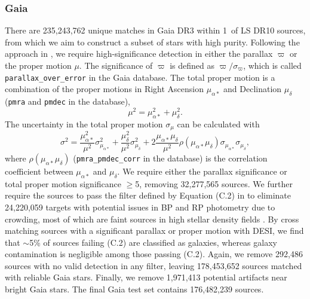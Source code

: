\documentclass[twocolumn,tighten]{aastex631}
\newcommand{\dr}[1]{DR{#1}}
\begin{document}
\begin{CJK*}{UTF8}{gbsn}
\subsubsection{Gaia}\label{sec:Gaia}
There are 235,243,762 unique matches in Gaia \dr{3} within 1\arcsec\ of LS \dr{10} sources, from which we aim to construct a subset of stars with high purity. Following the approach in , we require high-significance detection in either the parallax $\varpi$ or the proper motion $\mu$. The significance of $\varpi$ is defined as $\varpi/\sigma_\varpi$, which is called {\tt parallax\_over\_error} in the Gaia database. The total proper motion is a combination of the proper motions in Right Ascension $\mu_{\alpha*}$ and Declination $\mu_\delta$ ({\tt pmra} and {\tt pmdec} in the database),
\begin{equation*}
    \mu^2 = \mu_{\alpha*}^2 + \mu_\delta^2.
\end{equation*}
The uncertainty in the total proper motion $\sigma_\mu$ can be calculated with
\begin{equation*}
    \sigma^2 = \frac{\mu_{\alpha*}^2}{\mu^2}\sigma_{\mu_{\alpha*}}^2 + \frac{\mu_{\delta}^2}{\mu^2}\sigma_{\mu_{\delta}}^2 + 2\frac{\mu_{\alpha*}\mu_\delta}{\mu^2}\rho(\mu_{\alpha*}\mu_\delta)\sigma_{\mu_{\alpha*}}\sigma_{\mu_{\delta}},
\end{equation*}
where $\rho(\mu_{\alpha*}\mu_\delta)$ ({\tt pmra\_pmdec\_corr} in the database) is the correlation coefficient between $\mu_{\alpha*}$ and $\mu_\delta$. We require either the parallax significance or total proper motion significance $\ge$5, removing 32,277,565 sources. 
We further require the sources to pass the filter defined by Equation (C.2) in \cite{Lindegren_2018} to eliminate 24,220,059 targets with potential issues in BP and RP photometry {due to crowding, most of which are faint sources in high stellar density fields \citep{Gaia_2018}. By cross matching sources with a significant parallax or proper motion with DESI, we find that $\sim$5\% of sources failing (C.2) are classified as galaxies, whereas galaxy contamination is negligible among those passing (C.2).} Again, we remove 292,486 sources with no valid detection in any filter, leaving 178,453,652 sources matched with reliable Gaia stars. Finally, we remove 1,971,413 potential artifacts near bright Gaia stars. The final Gaia test set contains 176,482,239 sources.


\end{CJK*}
\end{document}

